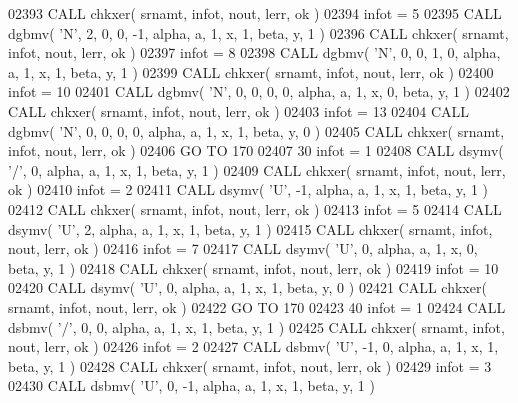 \begin{DoxyCode}
02393       \textcolor{keyword}{CALL }chkxer( srnamt, infot, nout, lerr, ok )
02394       infot = 5
02395       \textcolor{keyword}{CALL }dgbmv( \textcolor{stringliteral}{'N'}, 2, 0, 0, -1, alpha, a, 1, x, 1, beta, y, 1 )
02396       \textcolor{keyword}{CALL }chkxer( srnamt, infot, nout, lerr, ok )
02397       infot = 8
02398       \textcolor{keyword}{CALL }dgbmv( \textcolor{stringliteral}{'N'}, 0, 0, 1, 0, alpha, a, 1, x, 1, beta, y, 1 )
02399       \textcolor{keyword}{CALL }chkxer( srnamt, infot, nout, lerr, ok )
02400       infot = 10
02401       \textcolor{keyword}{CALL }dgbmv( \textcolor{stringliteral}{'N'}, 0, 0, 0, 0, alpha, a, 1, x, 0, beta, y, 1 )
02402       \textcolor{keyword}{CALL }chkxer( srnamt, infot, nout, lerr, ok )
02403       infot = 13
02404       \textcolor{keyword}{CALL }dgbmv( \textcolor{stringliteral}{'N'}, 0, 0, 0, 0, alpha, a, 1, x, 1, beta, y, 0 )
02405       \textcolor{keyword}{CALL }chkxer( srnamt, infot, nout, lerr, ok )
02406       \textcolor{keywordflow}{GO TO} 170
02407    30 infot = 1
02408       \textcolor{keyword}{CALL }dsymv( \textcolor{stringliteral}{'/'}, 0, alpha, a, 1, x, 1, beta, y, 1 )
02409       \textcolor{keyword}{CALL }chkxer( srnamt, infot, nout, lerr, ok )
02410       infot = 2
02411       \textcolor{keyword}{CALL }dsymv( \textcolor{stringliteral}{'U'}, -1, alpha, a, 1, x, 1, beta, y, 1 )
02412       \textcolor{keyword}{CALL }chkxer( srnamt, infot, nout, lerr, ok )
02413       infot = 5
02414       \textcolor{keyword}{CALL }dsymv( \textcolor{stringliteral}{'U'}, 2, alpha, a, 1, x, 1, beta, y, 1 )
02415       \textcolor{keyword}{CALL }chkxer( srnamt, infot, nout, lerr, ok )
02416       infot = 7
02417       \textcolor{keyword}{CALL }dsymv( \textcolor{stringliteral}{'U'}, 0, alpha, a, 1, x, 0, beta, y, 1 )
02418       \textcolor{keyword}{CALL }chkxer( srnamt, infot, nout, lerr, ok )
02419       infot = 10
02420       \textcolor{keyword}{CALL }dsymv( \textcolor{stringliteral}{'U'}, 0, alpha, a, 1, x, 1, beta, y, 0 )
02421       \textcolor{keyword}{CALL }chkxer( srnamt, infot, nout, lerr, ok )
02422       \textcolor{keywordflow}{GO TO} 170
02423    40 infot = 1
02424       \textcolor{keyword}{CALL }dsbmv( \textcolor{stringliteral}{'/'}, 0, 0, alpha, a, 1, x, 1, beta, y, 1 )
02425       \textcolor{keyword}{CALL }chkxer( srnamt, infot, nout, lerr, ok )
02426       infot = 2
02427       \textcolor{keyword}{CALL }dsbmv( \textcolor{stringliteral}{'U'}, -1, 0, alpha, a, 1, x, 1, beta, y, 1 )
02428       \textcolor{keyword}{CALL }chkxer( srnamt, infot, nout, lerr, ok )
02429       infot = 3
02430       \textcolor{keyword}{CALL }dsbmv( \textcolor{stringliteral}{'U'}, 0, -1, alpha, a, 1, x, 1, beta, y, 1 )

\end{DoxyCode}
